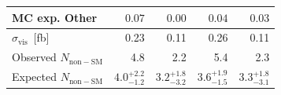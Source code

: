 \documentclass[10pt, svgnames]{beamer}
\begin{document}
\begin{frame}
\begin{center}
{\begin{tabular}{lrrrr}
      MC exp. Other                & $0.07$                & $0.00$                & $0.04$                & $0.03$             \\
      \midrule
      $\sigma_\mathrm{vis}$~[fb]   & 0.23                  & 0.11                  & 0.26                  & 0.11                  \\
      Observed $N_\mathrm{non-SM}$ & 4.8                   & 2.2                   & 5.4                   & 2.3                   \\
      Expected $N_\mathrm{non-SM}$ & ${4.0}^{+2.2}_{-1.2}$ & ${3.2}^{+1.8}_{-3.2}$ & ${3.6}^{+1.9}_{-1.5}$ & ${3.3}^{+1.8}_{-3.1}$ \\
      \bottomrule
      \end{tabular}
    }
  \end{center}
\end{frame}
\end{document}

